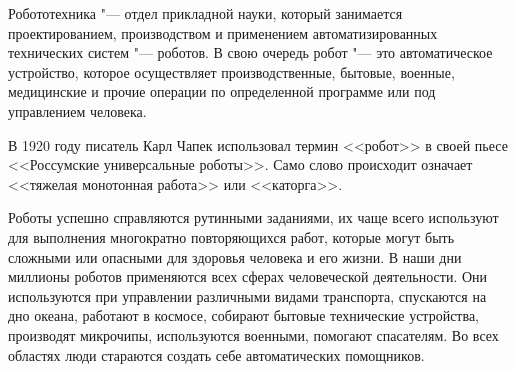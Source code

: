 \documentclass[bachelor, och, referat]{SCWorks}
\begin{document}


\tableofcontents





\intro


Робототехника "--- отдел прикладной науки, который занимается проектированием,
производством и применением автоматизированных технических систем "--- роботов.
В свою очередь робот "--- это автоматическое устройство, которое осуществляет
производственные, бытовые, военные, медицинские и прочие операции по
определенной программе или под управлением человека.

В 1920 году писатель Карл Чапек использовал термин <<робот>> в своей пьесе
<<Россумские универсальные роботы>>. Само слово происходит означает <<тяжелая
монотонная работа>> или <<каторга>>.

Роботы успешно справляются рутинными заданиями, их чаще всего используют для
выполнения многократно повторяющихся работ, которые могут быть сложными или
опасными для здоровья человека и его жизни. В наши дни миллионы роботов
применяются всех сферах человеческой деятельности. Они используются при
управлении различными видами транспорта, спускаются на дно океана, работают в
космосе, собирают бытовые технические устройства, производят микрочипы,
используются военными, помогают спасателям. Во всех областях люди стараются
создать себе автоматических помощников. 
\end{document}
